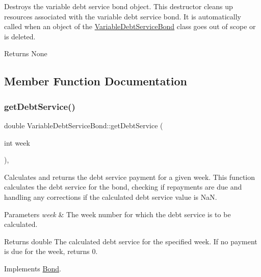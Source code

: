 Destroys the variable debt service bond object. This destructor cleans up resources associated with the variable debt service bond. It is automatically called when an object of the {\ttfamily \mbox{\hyperlink{classVariableDebtServiceBond}{Variable\+Debt\+Service\+Bond}}} class goes out of scope or is deleted. 

\begin{DoxyReturn}{Returns}
None 
\end{DoxyReturn}


\subsection{Member Function Documentation}
\mbox{\label{classVariableDebtServiceBond_a575a9a41df38e005ba0a1cff3eb2b921}} 
\subsubsection{\texorpdfstring{get\+Debt\+Service()}{getDebtService()}}
{\footnotesize\ttfamily double Variable\+Debt\+Service\+Bond\+::get\+Debt\+Service (\begin{DoxyParamCaption}\item[{int}]{week }\end{DoxyParamCaption})\hspace{0.3cm}{\ttfamily [override]}, {\ttfamily [virtual]}}



Calculates and returns the debt service payment for a given week. This function calculates the debt service for the bond, checking if repayments are due and handling any corrections if the calculated debt service value is NaN. 


\begin{DoxyParams}{Parameters}
{\em week} & The week number for which the debt service is to be calculated.\\
\hline
\end{DoxyParams}
\begin{DoxyReturn}{Returns}
double The calculated debt service for the specified week. If no payment is due for the week, returns 0. 
\end{DoxyReturn}


Implements \mbox{\hyperlink{classBond_a98d8ecaf4b36319674ebd220598996bc}{Bond}}.


